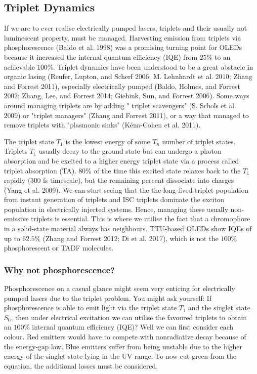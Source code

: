 \documentclass[
  letterpaper,
  DIV=11,
  numbers=noendperiod,
  oneside]{scrreprt}
\begin{document}
\hypertarget{triplet-dynamics}{%
\subsection{Triplet Dynamics}\label{triplet-dynamics}}

If we are to ever realise electrically pumped lasers, triplets and their
usually not luminescent property, must be managed. Harvesting emission
from triplets via phosphorescence (Baldo et al. 1998) was a promising
turning point for OLEDs because it increased the internal quantum
efficiency (IQE) from \(25\%\) to an achievable \(100\%\). Triplet
dynamics have been understood to be a great obstacle in organic lasing
(Reufer, Lupton, and Scherf 2006; M. Lehnhardt et al. 2010; Zhang and
Forrest 2011), especially electrically pumped (Baldo, Holmes, and
Forrest 2002; Zhang, Lee, and Forrest 2014; Giebink, Sun, and Forrest
2006). Some ways around managing triplets are by adding " triplet
scavengers" (S. Schols et al. 2009) or "triplet managers" (Zhang and
Forrest 2011), or a way that managed to remove triplets with "plasmonic
sinks" (Kéna-Cohen et al. 2011).

The triplet state \(T_1\) is the lowest energy of some \(T_n\) number of
triplet states. Triplets \(T_1\) usually decay to the ground state but
can undergo a photon absorption and be excited to a higher energy
triplet state via a process called triplet absorption (TA). \(80\%\) of
the time this excited state relaxes back to the \(T_1\) rapidly (300 fs
timescale), but the remaining percent dissociate into charges (Yang et
al. 2009). We can start seeing that the the long-lived triplet
population from instant generation of triplets and ISC triplets dominate
the exciton population in electrically injected systems. Hence, managing
these usually non-emissive triplets is essential. This is where we
utilise the fact that a chromophore in a solid-state material always has
neighbours. TTU-based OLEDs show IQEs of up to \(62.5\%\) (Zhang and
Forrest 2012; Di et al. 2017), which is not the \(100\%\) phosphorescent
or TADF molecules.

\hypertarget{sub:phos}{%
\subsubsection{Why not phosphorescence?}\label{sub:phos}}

Phosphorescence on a casual glance might seem very enticing for
electrically pumped lasers due to the triplet problem. You might ask
yourself: If phosphorescence is able to emit light via the triplet state
\(T_1\) and the singlet state \(S_0\), then under electrical excitation
we can utilise the favoured triplets to obtain an \(100\%\) internal
quantum efficiency (IQE)? Well we can first consider each colour. Red
emitters would have to compete with nonradiative decay because of the
energy-gap law. Blue emitters suffer from being unstable due to the
higher energy of the singlet state lying in the UV range. To now cut
green from the equation, the additional losses must be considered.
\end{document}
